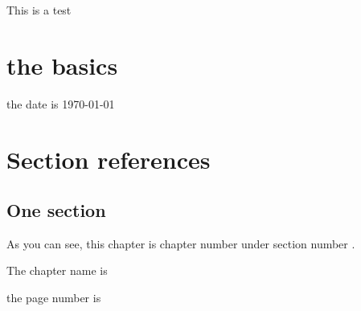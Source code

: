 \documentclass[12pt]{report}
\begin{document}
This is a test 

\chapter{the basics}
the date is \today 


\chapter{Section references }
\section{One section }

As you can see, this chapter is chapter number \thechapter under section number \thesection. %

The chapter name is \chaptername 

the page number is \thepage 

\pagebreak 
\end{document}
